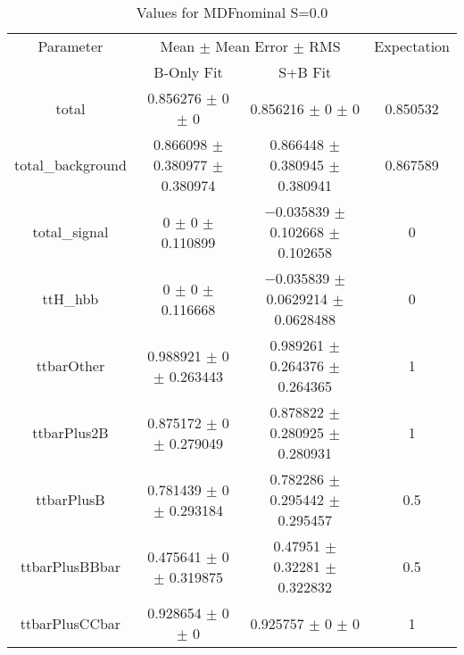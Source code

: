 \begin{table}
\centering
\caption{Values for MDFnominal S=0.0}
\begin{tabular}{cccc}
\toprule
Parameter & \multicolumn{2}{c}{Mean $\pm$ Mean Error $\pm$ RMS} & Expectation\\
 & B-Only Fit & S+B Fit & \\
\midrule
total & \num{0.856276} $\pm$ \num{0} $\pm$ \num{0} & \num{0.856216} $\pm$ \num{0} $\pm$ \num{0} & \num{0.850532}\\
total\_background & \num{0.866098} $\pm$ \num{0.380977} $\pm$ \num{0.380974} & \num{0.866448} $\pm$ \num{0.380945} $\pm$ \num{0.380941} & \num{0.867589}\\
total\_signal & \num{0} $\pm$ \num{0} $\pm$ \num{0.110899} & \num{-0.035839} $\pm$ \num{0.102668} $\pm$ \num{0.102658} & \num{0}\\
ttH\_hbb & \num{0} $\pm$ \num{0} $\pm$ \num{0.116668} & \num{-0.035839} $\pm$ \num{0.0629214} $\pm$ \num{0.0628488} & \num{0}\\
ttbarOther & \num{0.988921} $\pm$ \num{0} $\pm$ \num{0.263443} & \num{0.989261} $\pm$ \num{0.264376} $\pm$ \num{0.264365} & \num{1}\\
ttbarPlus2B & \num{0.875172} $\pm$ \num{0} $\pm$ \num{0.279049} & \num{0.878822} $\pm$ \num{0.280925} $\pm$ \num{0.280931} & \num{1}\\
ttbarPlusB & \num{0.781439} $\pm$ \num{0} $\pm$ \num{0.293184} & \num{0.782286} $\pm$ \num{0.295442} $\pm$ \num{0.295457} & \num{0.5}\\
ttbarPlusBBbar & \num{0.475641} $\pm$ \num{0} $\pm$ \num{0.319875} & \num{0.47951} $\pm$ \num{0.32281} $\pm$ \num{0.322832} & \num{0.5}\\
ttbarPlusCCbar & \num{0.928654} $\pm$ \num{0} $\pm$ \num{0} & \num{0.925757} $\pm$ \num{0} $\pm$ \num{0} & \num{1}\\
\bottomrule
\end{tabular}
\end{table}